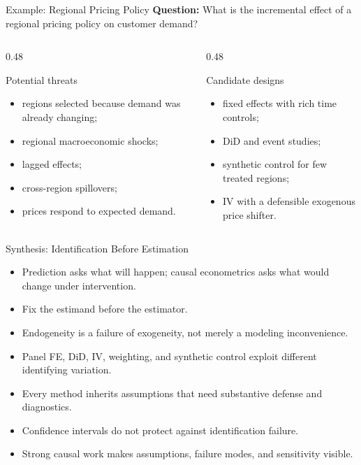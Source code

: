 \documentclass[aspectratio=169,11pt]{beamer}
\begin{document}
\begin{frame}{Example: Regional Pricing Policy}
\textbf{Question:} What is the incremental effect of a regional pricing policy on customer demand?

\begin{columns}[T]
\begin{column}{0.48\textwidth}
\begin{block}{Potential threats}
\begin{itemize}
\item regions selected because demand was already changing;
\item regional macroeconomic shocks;
\item lagged effects;
\item cross-region spillovers;
\item prices respond to expected demand.
\end{itemize}
\end{block}
\end{column}
\begin{column}{0.48\textwidth}
\begin{block}{Candidate designs}
\begin{itemize}
\item fixed effects with rich time controls;
\item DiD and event studies;
\item synthetic control for few treated regions;
\item IV with a defensible exogenous price shifter.
\end{itemize}
\end{block}
\end{column}
\end{columns}
\end{frame}

\begin{frame}{Synthesis: Identification Before Estimation}
\begin{itemize}
\item Prediction asks what will happen; causal econometrics asks what would change under intervention.
\item Fix the estimand before the estimator.
\item Endogeneity is a failure of exogeneity, not merely a modeling inconvenience.
\item Panel FE, DiD, IV, weighting, and synthetic control exploit different identifying variation.
\item Every method inherits assumptions that need substantive defense and diagnostics.
\item Confidence intervals do not protect against identification failure.
\item Strong causal work makes assumptions, failure modes, and sensitivity visible.
\end{itemize}
\end{frame}
\end{document}
